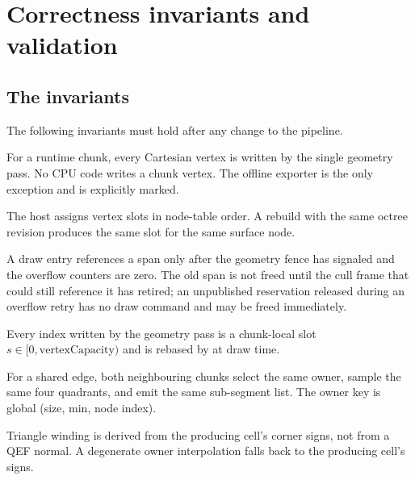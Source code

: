 \section{Correctness invariants and validation}
\label{sec:validation}

\subsection{The invariants}

The following invariants must hold after any change to the pipeline.

\begin{invariant}
For a runtime chunk, every Cartesian vertex is written by the single
 geometry pass.  No CPU code writes a chunk
vertex.  The offline exporter is the only exception and is explicitly
marked.
\end{invariant}

\begin{invariant}
The host assigns vertex slots in node-table order.  A rebuild with the same
octree revision produces the same slot for the same surface node.
\end{invariant}

\begin{invariant}
A draw entry references a span only after the geometry fence has signaled
and the overflow counters are zero.  The old span is not freed until the
cull frame that could still reference it has retired; an unpublished
reservation released during an overflow retry has no draw command and may
be freed immediately.
\end{invariant}

\begin{invariant}
Every index written by the geometry pass is a chunk-local slot
$s\in[0,\text{vertexCapacity})$ and is rebased by
 at draw time.
\end{invariant}

\begin{invariant}
For a shared edge, both neighbouring chunks select the same owner, sample
the same four quadrants, and emit the same sub-segment list.  The owner
key is global (size, min, node index).
\end{invariant}

\begin{invariant}
Triangle winding is derived from the producing cell's corner signs, not
from a QEF normal.  A degenerate owner interpolation falls back to the
producing cell's signs.
\end{invariant}

